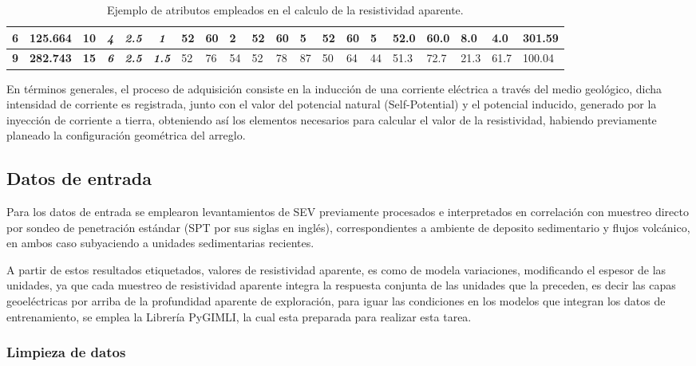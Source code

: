 \begin{table}[]
{\begin{tabular}{c|c|c|c|c|c|l|l|l|l|l|l|l|l|l|l|l|l|l|l}
			\rowcolor[HTML]{FFFFFF} 
			\textbf{6} & \textbf{125.664} & \textbf{10} & \textit{\textbf{4}} & \textit{\textbf{2.5}} & \textit{\textbf{1}} & 52 & 60 & 2 & 52 & 60 & 5 & 52 & 60 & 5 & 52.0 & 60.0 & 8.0 & 4.0 & 301.59 \\ \hline
			\rowcolor[HTML]{FFFFFF} 
			\textbf{9} & \textbf{282.743} & \textbf{15} & \textit{\textbf{6}} & \textit{\textbf{2.5}} & \textit{\textbf{1.5}} & 52 & 76 & 54 & 52 & 78 & 87 & 50 & 64 & 44 & 51.3 & 72.7 & 21.3 & 61.7 & 100.04
		\end{tabular}%
	}
	\caption{Ejemplo de atributos empleados en el calculo de la resistividad aparente.}
	\label{tab:T1}
\end{table}
	
	En términos generales, el proceso de adquisición consiste en la inducción de una corriente eléctrica a través del medio geológico, dicha intensidad de corriente es registrada, junto con el valor del potencial natural (Self-Potential) y el potencial inducido, generado por la inyección de corriente a tierra, obteniendo así los elementos necesarios para calcular el valor de la resistividad, habiendo previamente planeado la configuración geométrica del arreglo.

	\subsection{Datos de entrada}
		
		Para los datos de entrada se emplearon levantamientos de SEV previamente procesados e interpretados en correlación con muestreo directo por sondeo de penetración estándar (SPT por sus siglas en inglés), correspondientes a ambiente de deposito sedimentario y flujos volcánico, en ambos caso subyaciendo a unidades sedimentarias recientes.
		
		A partir de estos resultados etiquetados, valores de resistividad aparente, es como de modela variaciones, modificando el espesor de las unidades, ya que cada muestreo de resistividad aparente integra la respuesta conjunta de las unidades que la preceden, es decir las capas geoeléctricas por arriba de la profundidad aparente de exploración, para iguar las condiciones en los modelos que integran los datos de entrenamiento, se emplea la Librería PyGIMLI, la cual esta preparada para realizar esta tarea.
		
		\subsubsection{Limpieza de datos}
		
